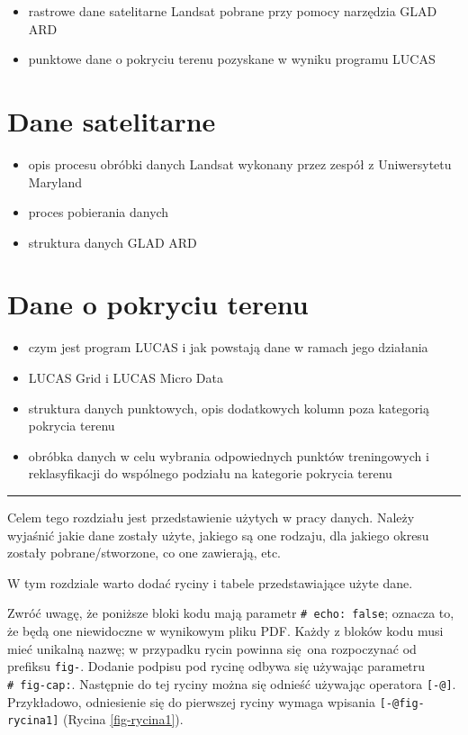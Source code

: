 \documentclass{amuthesis}
\begin{document}
\begin{itemize}
\item
  rastrowe dane satelitarne Landsat pobrane przy pomocy narzędzia GLAD
  ARD
\item
  punktowe dane o pokryciu terenu pozyskane w wyniku programu LUCAS
\end{itemize}

\hypertarget{sec-sat}{%
\section{Dane satelitarne}\label{sec-sat}}

\begin{itemize}
\item
  opis procesu obróbki danych Landsat wykonany przez zespół z
  Uniwersytetu Maryland
\item
  proces pobierania danych
\item
  struktura danych GLAD ARD
\end{itemize}

\hypertarget{sec-landcover}{%
\section{Dane o pokryciu terenu}\label{sec-landcover}}

\begin{itemize}
\item
  czym jest program LUCAS i jak powstają dane w ramach jego działania
\item
  LUCAS Grid i LUCAS Micro Data
\item
  struktura danych punktowych, opis dodatkowych kolumn poza kategorią
  pokrycia terenu
\item
  obróbka danych w celu wybrania odpowiednych punktów treningowych i
  reklasyfikacji do wspólnego podziału na kategorie pokrycia terenu
\end{itemize}

\begin{center}\rule{0.5\linewidth}{0.5pt}\end{center}

Celem tego rozdziału jest przedstawienie użytych w pracy danych. Należy
wyjaśnić jakie dane zostały użyte, jakiego są one rodzaju, dla jakiego
okresu zostały pobrane/stworzone, co one zawierają, etc.

W tym rozdziale warto dodać ryciny i tabele przedstawiające użyte dane.

Zwróć uwagę, że poniższe bloki kodu mają parametr
\texttt{\#\textbar{}\ echo:\ false}; oznacza to, że będą one niewidoczne
w wynikowym pliku PDF. Każdy z bloków kodu musi mieć unikalną nazwę; w
przypadku rycin powinna się~ona rozpoczynać od prefiksu \texttt{fig-}.
Dodanie podpisu pod rycinę odbywa się używając parametru
\texttt{\#\textbar{}\ fig-cap:}. Następnie do tej ryciny można się
odnieść używając operatora \texttt{{[}-@{]}}. Przykładowo, odniesienie
się do pierwszej ryciny wymaga wpisania \texttt{{[}-@fig-rycina1{]}}
(Rycina \ref{fig-rycina1}).
\end{document}
